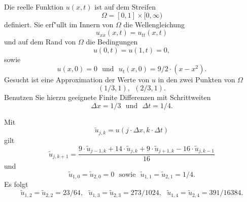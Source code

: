 Die reelle Funktion $u(x,t)$ ist auf dem Streifen
\[
\Omega = [0, 1] \times [0,\infty)
\]
definiert. Sie erf"ullt im Innern von $\Omega$ die Wellengleichung
\[
u_{xx}(x,t) = u_{tt}(x,t)
\]
und auf dem Rand von $\Omega$ die Bedingungen
\[
u(0,t) = u(1,t) = 0,
\]
sowie
\[
u(x,0) = 0 \ \ \ \mbox{und} \ \ \ u_t(x,0) = 9/2 \cdot (x-x^2).
\]
Gesucht ist eine Approximation der Werte von $u$ in den zwei Punkten von $\Omega$
\[
(1/3, 1), \ \  (2/3, 1).
\]
Benutzen Sie hierzu geeignete Finite Differenzen mit Schrittweiten
\[
\Delta x = 1/3 \ \ \  \mbox{und} \ \  \ \Delta t = 1/4.
\]

\begin{loesung}
Mit
\[
\tilde u_{j,k} = u(j \cdot \Delta x, k \cdot \Delta t)
\]
gilt
\[
\tilde u_{j, k+1} = \frac{9 \cdot \tilde u_{j-1, k} + 14 \cdot \tilde u_{j, k} + 9 \cdot \tilde u_{j+1, k} - 16 \cdot \tilde u_{j, k-1}}{16}
\]
und
\[
\tilde u_{1,0} = \tilde u_{2,0} = 0 \ \ \ \mbox{sowie} \ \ \ \tilde u_{1,1} = \tilde u_{2,1} = 1/4.
\]
Es folgt
\[
\tilde u_{1,2} = \tilde u_{2,2} = 23/64, \ \ \ \tilde u_{1,3} = \tilde u_{2,3} = 273/1024, \ \ \ \tilde u_{1,4} = \tilde u_{2,4} = 391/16384.
\]
\end{loesung}

